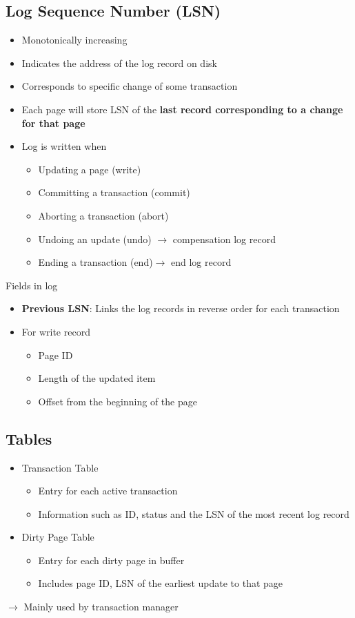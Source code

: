 \subsection{Log Sequence Number (LSN)}
\begin{itemize}
	\item Monotonically increasing
	\item Indicates the address of the log record on disk
	\item Corresponds to specific change of some transaction
	\item Each page will store LSN of the \textbf{last record corresponding to a change for that page}
	\item Log is written when
	\begin{itemize}
		\item Updating a page (write)
		\item Committing a transaction (commit)
		\item Aborting a transaction (abort)
		\item Undoing an update (undo) $\rightarrow$ compensation log record
		\item Ending a transaction (end)$\rightarrow$ end log record
	\end{itemize}
\end{itemize}
Fields in log
\begin{itemize}
	\item \textbf{Previous LSN}: Links the log records in reverse order for each transaction
	\item For write record
	\begin{itemize}
		\item Page ID
		\item Length of the updated item
		\item Offset from the beginning of the page
	\end{itemize}
\end{itemize}
\subsection{Tables}
\begin{itemize}
	\item Transaction Table
	\begin{itemize}
		\item Entry for each active transaction
		\item Information such as ID, status and the LSN of the most recent log record
	\end{itemize}
	\item Dirty Page Table
	\begin{itemize}
		\item Entry for each dirty page in buffer
		\item Includes page ID, LSN of the earliest update to that page
	\end{itemize}
\end{itemize}
$\rightarrow$ Mainly used by transaction manager

